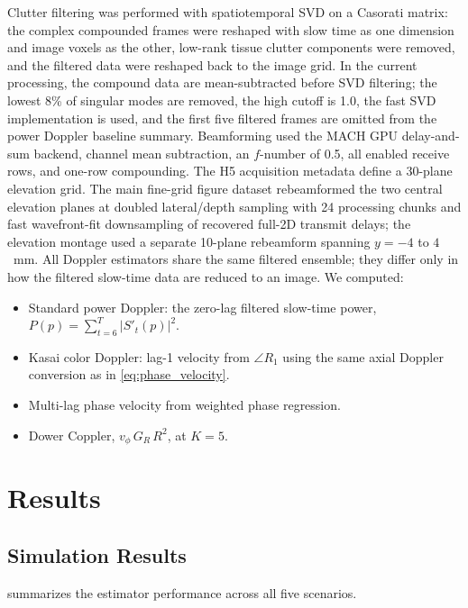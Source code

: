 \documentclass[11pt]{article}
\begin{document}
Clutter filtering was performed with spatiotemporal SVD on a Casorati
matrix: the complex compounded frames were reshaped with slow time as
one dimension and image voxels as the other, low-rank tissue clutter
components were removed, and the filtered data were reshaped back to
the image grid.  In the current processing, the compound data are
mean-subtracted before SVD filtering; the lowest 8\% of singular modes
are removed, the high cutoff is 1.0, the fast SVD implementation is
used, and the first five filtered frames are omitted from the power
Doppler baseline summary.  Beamforming used the MACH GPU
delay-and-sum backend, channel mean subtraction, an $f$-number of 0.5,
all enabled receive rows, and one-row compounding.  The H5 acquisition
metadata define a 30-plane elevation grid.  The main fine-grid figure
dataset rebeamformed the two central elevation planes at doubled
lateral/depth sampling with 24 processing chunks and fast
wavefront-fit downsampling of recovered full-2D transmit delays; the
elevation montage used a separate 10-plane rebeamform spanning
$y=-4$ to $4$~mm.  All Doppler estimators share
the same filtered ensemble; they differ only in how the filtered
slow-time data are reduced to an image.  We computed:
\begin{itemize}
  \item Standard power Doppler: the zero-lag filtered slow-time power,
    $P(p)=\sum_{t=6}^{T}|S'_t(p)|^2$.
  \item Kasai color Doppler: lag-1 velocity from $\angle R_1$ using
    the same axial Doppler conversion as in \cref{eq:phase_velocity}.
  \item Multi-lag phase velocity from weighted phase regression.
  \item Dower Coppler, $v_\phi\,G_R\,R^2$, at $K = 5$.
\end{itemize}


\section{Results}
\label{sec:results}

\subsection{Simulation Results}

 summarizes the estimator performance across
all five scenarios.
\end{document}
